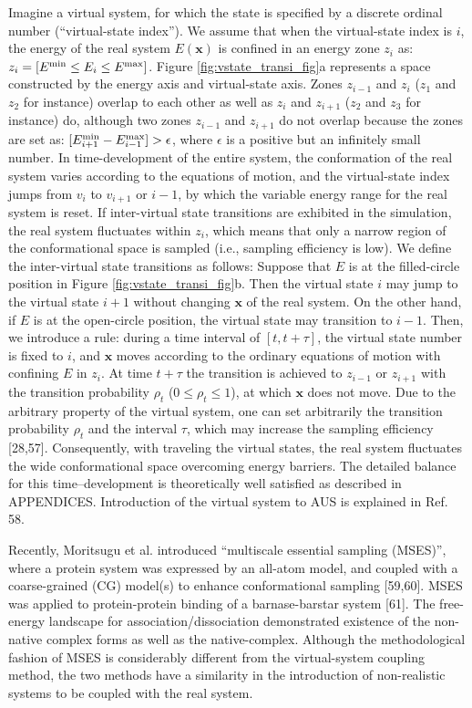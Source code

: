 Imagine a virtual system, for which the state is specified by a discrete ordinal number  (“virtual-state index”). We assume that when the virtual-state index is $i$, the energy of the real system $E(\bm{x})$ is confined in an energy zone $z_i$ as: $z_i = [E^{\rm min} \leq E_i  \leq E^{\rm max}]$. Figure \ref{fig:vstate_transi_fig}a represents a space constructed by the energy axis and virtual-state axis. Zones $z_{i-1}$ and $z_i$ ($z_1$ and $z_2$ for instance) overlap to each other as well as $z_i$ and $z_{i+1}$ ($z_2$ and $z_3$ for instance) do, although two zones $z_{i-1}$ and $z_{i+1}$ do not overlap because the zones are set as: $[E^{\rm min}_{i+1} - E^{\rm max}_{i-1}] > \epsilon$, where $\epsilon$ is a positive but an infinitely small number. In time-development of the entire system, the conformation of the real system varies according to the equations of motion, and the virtual-state index jumps from $v_i$ to $v_{i+1}$ or $i-1$, by which the variable energy range for the real system is reset. If inter-virtual state transitions are exhibited in the simulation, the real system fluctuates within $z_i$, which means that only a narrow region of the conformational space is sampled (i.e., sampling efficiency is low). We define the inter-virtual state transitions as follows: Suppose that $E$ is at the filled-circle position in Figure \ref{fig:vstate_transi_fig}b. Then the virtual state $i$ may jump to the virtual state $i+1$ without changing $\bm{x}$ of the real system. On the other hand, if $E$ is at the open-circle position, the virtual state may transition to $i-1$. Then, we introduce a rule: during a time interval of $[t,t+\tau]$, the virtual state number is fixed to $i$, and $\bm{x}$ moves according to the ordinary equations of motion with confining $E$ in $z_i$. At time $t+\tau$ the transition is achieved to $z_{i-1}$ or $z_{i+1}$ with the transition probability  $\rho_t$ ($0 \leq \rho_t \leq 1$), at which $\bm{x}$ does not move. Due to the arbitrary property of the virtual system, one can set arbitrarily the transition probability $\rho_t$ and the interval $\tau$, which may increase the sampling efficiency [28,57]. Consequently, with traveling the virtual states, the real system fluctuates the wide conformational space overcoming energy barriers. The detailed balance for this time–development is theoretically well satisfied as described in APPENDICES. Introduction of the virtual system to AUS is explained in Ref. 58. 

Recently, Moritsugu et al. introduced “multiscale essential sampling (MSES)”, where a protein system was expressed by an all-atom model, and coupled with a coarse-grained (CG) model(s) to enhance conformational sampling [59,60]. MSES was applied to protein-protein binding of a barnase-barstar system [61]. The free-energy landscape for association/dissociation demonstrated existence of the non-native complex forms as well as the native-complex. Although the methodological fashion of MSES is considerably different from the virtual-system coupling method, the two methods have a similarity in the introduction of non-realistic systems to be coupled with the real system.

